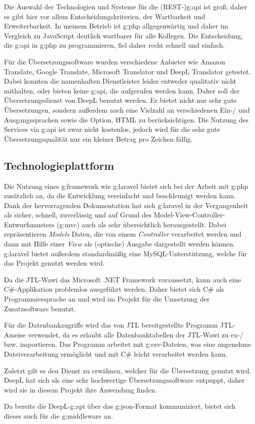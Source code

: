 Die Auswahl der Technologien und Systeme für die (REST-)\gls{g:api} ist groß, daher es gibt hier vor allem Entscheidungskriterien, der Wartbarkeit und Erweiterbarkeit. 
In meinem Betrieb ist \gls{g:php} allgegenwärtig und daher im Vergleich zu JavaScript deutlich wartbarer für alle Kollegen. 
Die Entscheidung, die \gls{g:api} in \gls{g:php} zu programmieren, fiel daher recht schnell und einfach.

Für die Übersetzungssoftware wurden verschiedene Anbieter wie Amazon Translate, Google Translate, Microsoft Translator und DeepL Translator getestet. 
Dabei konnten die namenhaften Dienstleister leider entweder qualitativ nicht mithalten, oder bieten keine \gls{g:api}, die aufgerufen werden kann. 
Daher soll der Übersetzungsdienst von DeepL benutzt werden.
Er bietet nicht nur sehr gute Übersetzungen, sondern außerdem auch eine Vielzahl an verschiedenen Ein-/ und Ausgangssprachen sowie die Option, HTML zu berücksichtigen. 
Die Nutzung des Services via \gls{g:api} ist zwar nicht kostenlos, jedoch wird für die sehr gute Übersetzungsqualität nur ein kleiner Betrag pro Zeichen fällig.


\subsection{Technologieplattform}

Die Nutzung eines \gls{g:framework} wie \gls{g:laravel} bietet sich bei der Arbeit mit \gls{g:php} zusätzlich an, da die Entwicklung vereinfacht und beschleunigt werden kann. 
Dank der hervorragenden Dokumentation hat sich \gls{g:laravel} in der Vergangenheit als sicher, schnell, zuverlässig und auf Grund des Model-View-Controller-Entwurfsmusters (\gls{g:mvc}) auch als sehr übersichtlich herausgestellt. 
Dabei repräsentieren \emph{Models} Daten, die von einem \emph{Controller} verarbeitet werden und dann mit Hilfe einer \emph{View} als (optische) Ausgabe dargestellt werden können.
\gls{g:laravel} bietet außerdem standardmäßig eine MySQL-Unterstützung, welche für das Projekt genutzt werden wird.

Da die JTL-Wawi das Microsoft .NET Framework voraussetzt, kann auch eine C\#-Applikation problemlos ausgeführt werden. 
Daher bietet sich C\# als Programmiersprache an und wird im Projekt für die Umsetzung der Zusatzsoftware benutzt. 

Für die Datenbankzugriffe wird das von JTL bereitgestellte Programm JTL-Ameise verwendet, da es erlaubt alle Datenbanktabellen der JTL-Wawi zu ex-/ bzw. importieren. 
Das Programm arbeitet mit \gls{g:csv}-Dateien, was eine angenehme Dateiverarbeitung ermöglicht und mit C\# leicht verarbeitet werden kann.

Zuletzt gilt es den Dienst zu erwähnen, welcher für die Übersetzung genutzt wird. 
DeepL hat sich als eine sehr hochwertige Übersetzungssoftware entpuppt, daher wird sie in diesem Projekt ihre Anwendung finden.

Da bereits die DeepL-\gls{g:api} über das \gls{g:json}-Format kommuniziert, bietet sich dieses auch für die \gls{g:middleware} an.